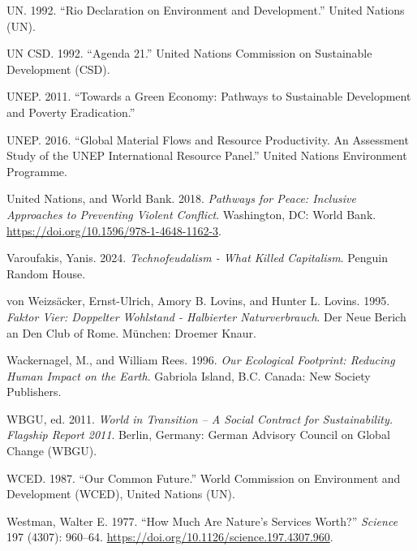 \documentclass[
  a4paper,
  openany]{book}
\newlength{\cslhangindent}
\newenvironment{CSLReferences}[2] %
 {\begin{list}{}{%
  \setlength{\itemindent}{0pt}
  \setlength{\leftmargin}{0pt}
  \setlength{\parsep}{0pt}
  \ifodd #1
   \setlength{\leftmargin}{\cslhangindent}
   \setlength{\itemindent}{-1\cslhangindent}
  \fi
  \setlength{\itemsep}{#2\baselineskip}}}
 {\end{list}}
\begin{document}
\begin{CSLReferences}{1}{0}
UN. 1992. {``Rio {Declaration} on {Environment} and {Development}.''}
United Nations (UN).

UN CSD. 1992. {``Agenda 21.''} United Nations Commission on Sustainable
Development (CSD).

UNEP. 2011. {``Towards a {Green Economy}: {Pathways} to {Sustainable
Development} and {Poverty Eradication}.''}

UNEP. 2016. {``{Global Material Flows and Resource Productivity. An
Assessment Study of the UNEP International Resource Panel}.''} United
Nations Environment Programme.

United Nations, and World Bank. 2018. \emph{Pathways for {Peace}:
{Inclusive Approaches} to {Preventing Violent Conflict}}. Washington,
DC: World Bank. \url{https://doi.org/10.1596/978-1-4648-1162-3}.

Varoufakis, Yanis. 2024. \emph{Technofeudalism - {What} Killed
Capitalism}. Penguin Random House.

von Weizsäcker, Ernst-Ulrich, Amory B. Lovins, and Hunter L. Lovins.
1995. \emph{Faktor {Vier}: {Doppelter Wohlstand} - Halbierter
{Naturverbrauch}}. Der Neue {Berich} an Den {Club} of {Rome}. M{ü}nchen:
Droemer Knaur.

Wackernagel, M., and William Rees. 1996. \emph{Our {Ecological
Footprint}: {Reducing Human Impact} on the {Earth}}. Gabriola Island,
B.C. Canada: New Society Publishers.

WBGU, ed. 2011. \emph{World in {Transition} -- {A} {Social} {Contract}
for {Sustainability}. {Flagship} {Report} 2011}. Berlin, Germany: German
Advisory Council on Global Change (WBGU).

WCED. 1987. {``Our {Common Future}.''} {World Commission on Environment
and Development (WCED), United Nations (UN)}.

Westman, Walter E. 1977. {``How {Much Are Nature}'s {Services Worth}?''}
\emph{Science} 197 (4307): 960--64.
\url{https://doi.org/10.1126/science.197.4307.960}.


\end{CSLReferences}
\end{document}
